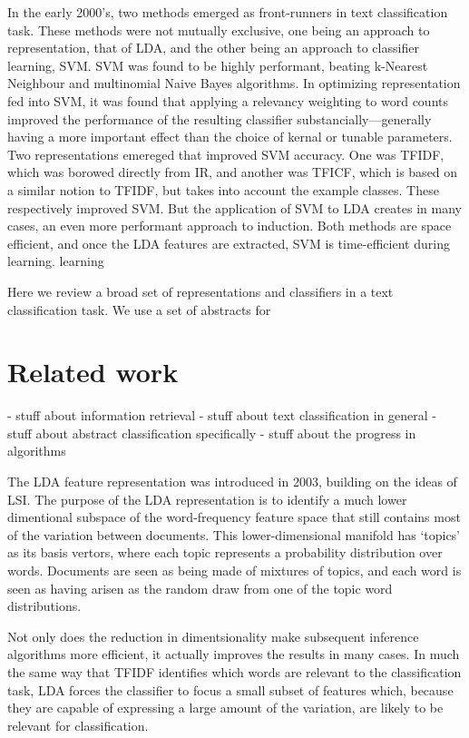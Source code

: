 \documentclass[conference,letterpaper]{IEEEtran}
\begin{document}
In the early 2000's, two methods emerged as front-runners in text 
classification task.  These methods were not mutually exclusive, one being
an approach to representation, that of LDA, and the other being an approach
to classifier learning, SVM.  SVM was found to be 
highly performant, beating k-Nearest Neighbour and multinomial Naive Bayes
algorithms.  In optimizing representation fed into SVM, it was found that
applying a relevancy weighting to word counts improved the performance of
the resulting classifier substancially---generally having a more important
effect than the choice of kernal or tunable parameters.  Two representations
emereged that improved SVM accuracy.  One was TFIDF, which was borowed 
directly from IR, and another was TFICF, which is based on a similar notion
to TFIDF, but takes into account the example classes.  These respectively 
improved SVM.  But the application of SVM to LDA creates in many cases,
an even more performant approach to induction.  Both methods are space
efficient, and once the LDA features are extracted, SVM is time-efficient
during learning.
learning 

Here we review a broad set of representations and classifiers in a text
classification task.  We use a set of abstracts for 
\section{Related work}
- stuff about information retrieval
- stuff about text classification in general
- stuff about abstract classification specifically
- stuff about the progress in algorithms


The LDA feature representation was introduced in 2003, building on the
ideas of LSI.  The purpose of the LDA representation is to identify a 
much lower dimentional subspace of the word-frequency feature space that still 
contains most of the variation between documents.  This lower-dimensional
manifold has `topics' as its basis vertors, where each topic represents a 
probability distribution over words.  Documents are seen as being made of
mixtures of topics, and each word is seen as having arisen as the random
draw from one of the topic word distributions.

Not only does the reduction in dimentsionality make subsequent inference
algorithms more efficient, it actually improves the results in many cases.
In much the same way that TFIDF identifies which words are relevant to the
classification task, LDA forces the classifier to focus a small subset of
features which, because they are capable of expressing a large amount of the 
variation, are likely to be relevant for classification.
\end{document}
